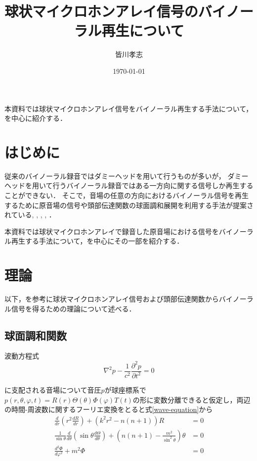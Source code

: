 \documentclass[a4paper,12pt]{jsarticle}
\begin{document}
\title{球状マイクロホンアレイ信号のバイノーラル再生について}
\author{皆川孝志}
\date{\today}
\maketitle

本資料では球状マイクロホンアレイ信号をバイノーラル再生する手法について，\cite{Andersson_undated-qg}を中心に紹介する．

\section{はじめに}
従来のバイノーラル録音ではダミーヘッドを用いて行うものが多いが，
ダミーヘッドを用いて行うバイノーラル録音ではある一方向に関する信号しか再生することができない．
そこで，音場の任意の方向におけるバイノーラル信号を再生するために原音場の信号や頭部伝達関数の球面調和展開を利用する手法が提案されている\cite{Andersson_undated-qg}, \cite{Noisternig2003-ug}, \cite{Otani2020-cg}, \cite{Schorkhuber2018-ql}, \cite{Zaunschirm2018-mn}．

本資料では球状マイクロホンアレイで録音した原音場における信号をバイノーラル再生する手法について，\cite{Andersson_undated-qg}を中心にその一部を紹介する．

\section{理論}
以下，\cite{Andersson_undated-qg}を参考に球状マイクロホンアレイ信号および頭部伝達関数からバイノーラル信号を得るための理論について述べる．

\subsection{球面調和関数}
波動方程式
\begin{equation}
    \label{wave-equation}
    \nabla^{2} p-\frac{1}{c^{2}} \frac{\partial^{2} p}{\partial t^{2}}=0
\end{equation}

に支配される音場について音圧$p$が球座標系で$p(r, \theta, \varphi, t) = R(r) \Theta(\theta) \Phi(\varphi) T(t) $の形に変数分離できると仮定し，両辺の時間-周波数に関するフーリエ変換をとると式\ref{wave-equation}から
\begin{align*}
    \frac{d}{d r}\left(r^{2} \frac{d R}{d r}\right)+\left(k^{2} r^{2}-n(n+1)\right) R                                                                    & =0 \\
    \frac{1}{\sin \theta} \frac{d}{d \theta}\left(\sin \theta \frac{d \Theta}{d \theta}\right)+\left(n(n+1)-\frac{m^{2}}{\sin ^{2} \theta}\right) \theta & =0 \\
    \frac{d^{2} \Phi}{d \varphi^{2}}+m^{2} \Phi                                                                                                          & =0
\end{align*}
\end{document}
